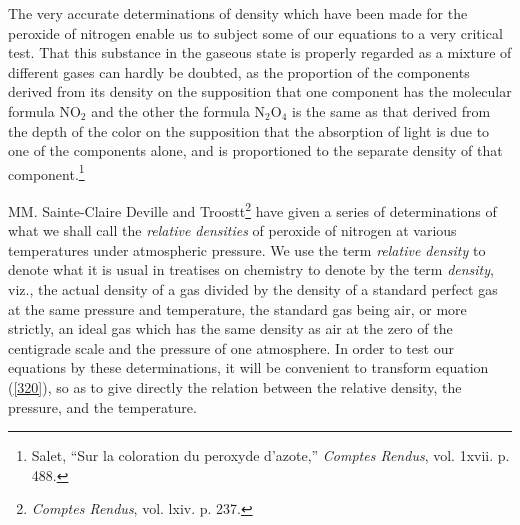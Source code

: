 \documentclass[12pt]{article}
\begin{document}
The very accurate determinations of density which have been made for the peroxide of nitrogen enable us to subject some of our equations to a very critical test. That this substance in the gaseous state is properly regarded as a mixture of different gases can hardly be doubted, as the proportion of the components derived from its density on the supposition that one component has the molecular formula NO$_2$ and the other the formula N$_2$O$_4$ is the same as that derived from the depth of the color on the supposition that the absorption of light is due to one of the components alone, and is proportioned to the separate density of that component.\footnote{Salet, ``Sur la coloration du peroxyde d'azote,'' \textit{Comptes Rendus}, vol. 1xvii. p. 488. }

MM. Sainte-Claire Deville and Troostt\footnote{\textit{Comptes Rendus}, vol. lxiv. p. 237.} have given a series of determinations of what we shall call the \textit{relative densities} of peroxide of nitrogen at various temperatures under atmospheric pressure. We use the term \textit{relative density} to denote what it is usual in treatises on chemistry to denote by the term \textit{density}, viz., the actual density of a gas divided by the density of a standard perfect gas at the same pressure and temperature, the standard gas being air, or more strictly, an ideal gas which has the same density as air at the zero of the centigrade scale and the pressure of one atmosphere. In order to test our equations by these determinations, it will be convenient to transform equation (\ref{320}), so as to give directly the relation between the relative density, the pressure, and the temperature.
\end{document}
